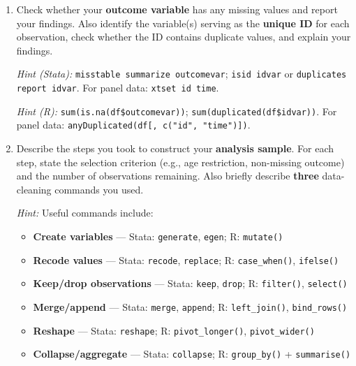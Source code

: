 \documentclass[paper=a4, fontsize=11pt]{scrartcl}
\begin{document}
\begin{enumerate}
\textit{Hint (R):} \texttt{haven::read\_dta()} for \texttt{.dta}; \texttt{readr::read\_csv()} for \texttt{.csv}; \texttt{readxl::read\_excel()} for Excel.

\vspace{0.3cm}

\item Check whether your \textbf{outcome variable} has any missing values and report your findings. Also identify the variable(s) serving as the \textbf{unique ID} for each observation, check whether the ID contains duplicate values, and explain your findings.

\textit{Hint (Stata):} \texttt{misstable summarize outcomevar}; \texttt{isid idvar} or \texttt{duplicates report idvar}. For panel data: \texttt{xtset id time}.

\textit{Hint (R):} \texttt{sum(is.na(df\$outcomevar))}; \texttt{sum(duplicated(df\$idvar))}. For panel data: \texttt{anyDuplicated(df[, c("id", "time")])}.

\vspace{0.3cm}

\item Describe the steps you took to construct your \textbf{analysis sample}. For each step, state the selection criterion (e.g., age restriction, non-missing outcome) and the number of observations remaining. Also briefly describe \textbf{three} data-cleaning commands you used.

\textit{Hint:} Useful commands include:
\begin{itemize}
\item \textbf{Create variables} --- Stata: \texttt{generate}, \texttt{egen}; R: \texttt{mutate()}
\item \textbf{Recode values} --- Stata: \texttt{recode}, \texttt{replace}; R: \texttt{case\_when()}, \texttt{ifelse()}
\item \textbf{Keep/drop observations} --- Stata: \texttt{keep}, \texttt{drop}; R: \texttt{filter()}, \texttt{select()}
\item \textbf{Merge/append} --- Stata: \texttt{merge}, \texttt{append}; R: \texttt{left\_join()}, \texttt{bind\_rows()}
\item \textbf{Reshape} --- Stata: \texttt{reshape}; R: \texttt{pivot\_longer()}, \texttt{pivot\_wider()}
\item \textbf{Collapse/aggregate} --- Stata: \texttt{collapse}; R: \texttt{group\_by()} + \texttt{summarise()}
\end{itemize}


\end{enumerate}
\end{document}
